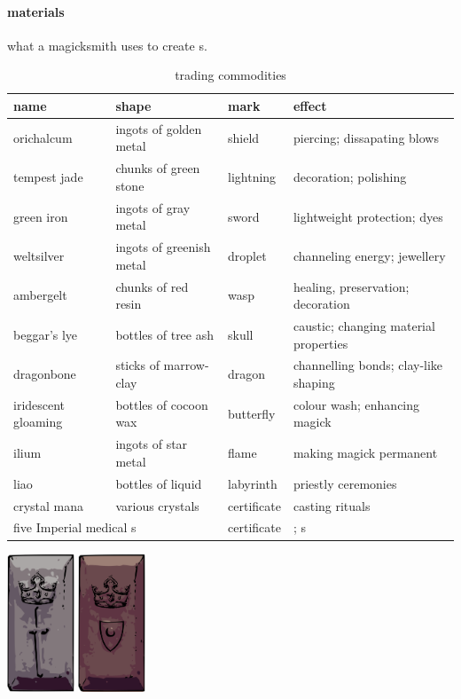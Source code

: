 \paragraph{materials} what a magicksmith uses to create s. \begin{table}\begin{tabular}{p{}p{}p{}p{}}name& shape&mark&effect\\\hline orichalcum&ingots of golden metal & shield& piercing; dissapating blows \\ tempest jade & chunks of green stone & lightning & decoration; polishing \\ green iron & ingots of gray metal & sword & lightweight protection; dyes \\ weltsilver & ingots of greenish metal & droplet & channeling energy; jewellery \\ ambergelt & chunks of red resin & wasp & healing, preservation; decoration \\ beggar's lye & bottles of tree ash & skull & caustic; changing material properties \\ dragonbone & sticks of marrow-clay & dragon & channelling bonds; clay-like shaping \\ iridescent gloaming & bottles of cocoon wax & butterfly & colour wash; enhancing magick \\ ilium & ingots of star metal & flame & making magick permanent \\ liao & bottles of liquid & labyrinth & priestly ceremonies \\ crystal mana & various crystals & certificate & casting rituals \\ \multicolumn{2}{l}{five Imperial medical \s{herb}s} & certificate & \s{medicine}; \s{potion}s \end{tabular}\caption{trading commodities}\end{table} \begin{center}\includegraphics[width=2cm]{encyclopedia/greeniron} \quad \includegraphics[width=2cm]{encyclopedia/orichalcum}\end{center}
